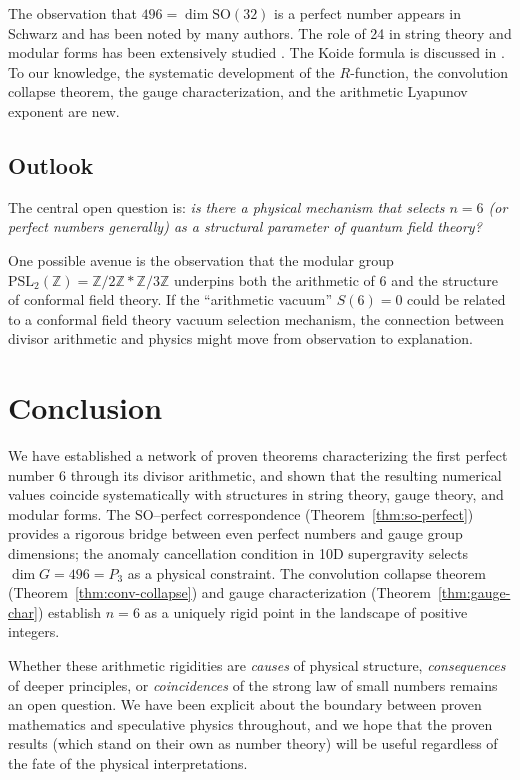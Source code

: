 \documentclass[11pt,letterpaper]{article}
\theoremstyle{definition}
\theoremstyle{remark}
\newcommand{\ZZ}{\mathbb{Z}}
\begin{document}
The observation that $496 = \dim\mathrm{SO}(32)$ is a perfect number 
appears in Schwarz \cite{Schwarz1984} and has been noted by many authors.
The role of 24 in string theory and modular forms has been extensively 
studied \cite{Gannon2006,Baez2001}. The Koide formula is discussed in 
\cite{Koide1983,Brannen2006,Foot1994}.
To our knowledge, the systematic development of the $R$-function, the 
convolution collapse theorem, the gauge characterization, and the 
arithmetic Lyapunov exponent are new.

\subsection{Outlook}

The central open question is: \emph{is there a physical mechanism 
that selects $n=6$ (or perfect numbers generally) as a structural 
parameter of quantum field theory?} 

One possible avenue is the observation that the modular group 
$\mathrm{PSL}_2(\ZZ) = \ZZ/2\ZZ * \ZZ/3\ZZ$ underpins both the 
arithmetic of $6$ and the structure of conformal field theory.
If the ``arithmetic vacuum'' $S(6) = 0$ could be related to a 
conformal field theory vacuum selection mechanism, the connection 
between divisor arithmetic and physics might move from observation 
to explanation.

\section{Conclusion}
\label{sec:conclusion}

We have established a network of proven theorems characterizing the 
first perfect number $6$ through its divisor arithmetic, and shown that 
the resulting numerical values coincide systematically with structures 
in string theory, gauge theory, and modular forms. 
The SO--perfect correspondence (Theorem~\ref{thm:so-perfect}) provides 
a rigorous bridge between even perfect numbers and gauge group dimensions; 
the anomaly cancellation condition in 10D supergravity selects 
$\dim G = 496 = P_3$ as a physical constraint.
The convolution collapse theorem (Theorem~\ref{thm:conv-collapse}) and 
gauge characterization (Theorem~\ref{thm:gauge-char}) establish 
$n = 6$ as a uniquely rigid point in the landscape of positive integers.

Whether these arithmetic rigidities are \emph{causes} of physical 
structure, \emph{consequences} of deeper principles, or 
\emph{coincidences} of the strong law of small numbers remains 
an open question. We have been explicit about the boundary between 
proven mathematics and speculative physics throughout, and we hope 
that the proven results (which stand on their own as number theory) 
will be useful regardless of the fate of the physical interpretations.
\end{document}

